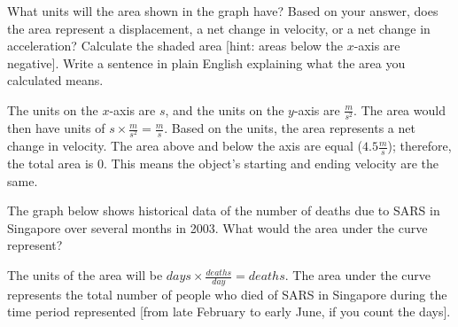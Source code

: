 \begin{Exercise}[label=units1]
	What units will the area shown in the graph have? Based on your answer, does the area represent a displacement, a net change in velocity, or a net change in acceleration? Calculate the shaded area [hint: areas below the $x$-axis are negative]. Write a sentence in plain English explaining what the area you calculated means.\\
\end{Exercise}

\begin{Answer}[ref=units1]
	The units on the $x$-axis are $s$, and the units on the $y$-axis are $\frac{m}{s^2}$. The area would then have units of $s \times \frac{m}{s^2}=\frac{m}{s}$. Based on the units, the area represents a net change in velocity. The area above and below the axis are equal ($4.5 \frac{m}{s}$); therefore, the total area is $0$. This means the object's starting and ending velocity are the same.
\end{Answer}

\begin{Exercise}[label=units2]
	The graph below shows historical data of the number of deaths due to SARS in Singapore over several months in 2003. What would the area under the curve represent?\\

\end{Exercise}

\begin{Answer}[ref=units2]
	The units of the area will be $days \times \frac{deaths}{day}=deaths$. The area under the curve represents the total number of people who died of SARS in Singapore during the time period represented [from late February to early June, if you count the days].
\end{Answer}

